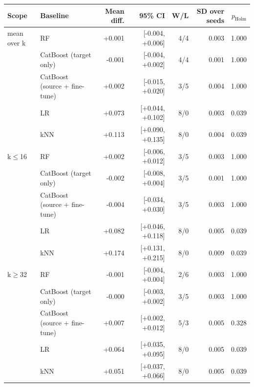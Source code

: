 \begin{tabular}{llrrrrr}
\toprule
Scope & Baseline & Mean diff. & 95\% CI & W/L & SD over seeds & $p_{\text{Holm}}$ \\
\midrule
mean over k & RF & +0.001 & [-0.004, +0.006] & 4/4 & 0.003 & 1.000 \\
 & CatBoost (target only) & -0.001 & [-0.004, +0.002] & 4/4 & 0.001 & 1.000 \\
 & CatBoost (source + fine-tune) & +0.002 & [-0.015, +0.020] & 3/5 & 0.004 & 1.000 \\
 & LR & +0.073 & [+0.044, +0.102] & 8/0 & 0.003 & 0.039 \\
 & kNN & +0.113 & [+0.090, +0.135] & 8/0 & 0.004 & 0.039 \\
\midrule
k$\leq$16 & RF & +0.002 & [-0.006, +0.012] & 3/5 & 0.003 & 1.000 \\
 & CatBoost (target only) & -0.002 & [-0.008, +0.004] & 3/5 & 0.001 & 1.000 \\
 & CatBoost (source + fine-tune) & -0.004 & [-0.034, +0.030] & 3/5 & 0.003 & 1.000 \\
 & LR & +0.082 & [+0.046, +0.118] & 8/0 & 0.005 & 0.039 \\
 & kNN & +0.174 & [+0.131, +0.215] & 8/0 & 0.009 & 0.039 \\
\midrule
k$\geq$32 & RF & -0.001 & [-0.004, +0.004] & 2/6 & 0.003 & 1.000 \\
 & CatBoost (target only) & -0.000 & [-0.003, +0.002] & 3/5 & 0.003 & 1.000 \\
 & CatBoost (source + fine-tune) & +0.007 & [+0.002, +0.012] & 5/3 & 0.005 & 0.328 \\
 & LR & +0.064 & [+0.035, +0.095] & 8/0 & 0.005 & 0.039 \\
 & kNN & +0.051 & [+0.037, +0.066] & 8/0 & 0.005 & 0.039 \\
\bottomrule
\end{tabular}
